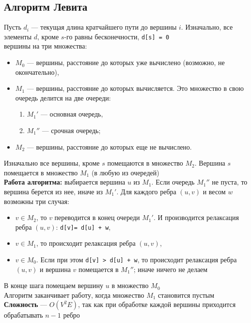 \documentclass[a4paper]{article}
\newcommand{\code}[1]{\colorbox{codegray}{\texttt{#1}}}
\begin{document}
\subsection{Алгоритм Левита}
Пусть $d_i$ — текущая длина кратчайшего пути до вершины $i$. Изначально, все элементы $d$, кроме $s$-го равны бесконечности, \code{d[s] = 0}\\[2mm]
 вершины на три множества:
\begin{itemize}
    \item $M_0$ — вершины, расстояние до которых уже вычислено (возможно, не окончательно),
    \item $M_1$ — вершины, расстояние до которых вычисляется. Это множество в свою очередь делится на две очереди:
    \begin{enumerate}
        \item $M_1'$ — основная очередь,
        \item $M_1''$ — срочная очередь;
    \end{enumerate}
    \item $M_2$ — вершины, расстояние до которых еще не вычислено.
\end{itemize}
Изначально все вершины, кроме $s$ помещаются в множество $M_2$. Вершина $s$ помещается в множество $M_1$ (в любую из очередей)\\[2mm]
\indent\textbf{Работа алгоритма:} выбирается вершина $u$ из $M_1$. Если очередь $M_1''$ не пуста, то вершина берется из нее, иначе из $M_1'$. Для каждого ребра $(u,v)$ и весом $w$ возможны три случая:
\begin{itemize}
    \item $v \in M_2$, то $v$ переводится в конец очереди $M_1'$. И производится релаксация ребра $(u,v)$: \code{d[v]= d[u] + w},
    \item $v \in M_1$, то происходит релаксация ребра $(u,v)$,
    \item $v \in M_0$. Если при этом \code{d[v] > d[u] + w}, то происходит релаксация ребра $(u,v)$ и вершина $v$ помещается в $M_1''$; иначе ничего не делаем
\end{itemize}
В конце шага помещаем вершину $u$ в множество $M_0$\\[2mm]
Алгоритм заканчивает работу, когда множество $M_1$ становится пустым\\[2mm]
\indent\textbf{Сложность} — $O(V^2E)$, так как при обработке каждой вершины приходится обрабатывать $n-1$ ребро
\end{document}
